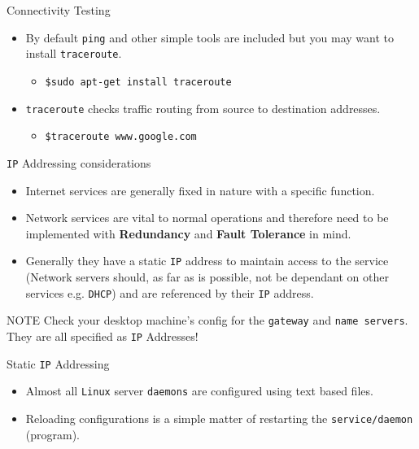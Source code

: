 \documentclass{beamer}
\begin{document}
\begin{frame}{Connectivity Testing}
  \begin{itemize}
    \item By default \texttt{ping} and other simple tools are included but you may want to install \texttt{traceroute}. 
      \begin{itemize}
        \item \texttt{\$sudo apt-get install traceroute}
      \end{itemize}
    \item \texttt{traceroute} checks traffic routing from source to destination addresses.
      \begin{itemize}
        \item \texttt{\$traceroute www.google.com}
      \end{itemize}
  \end{itemize}
\end{frame}

\begin{frame}{\texttt{IP} Addressing considerations}
   \begin{itemize}
     \item Internet services are generally fixed in nature with a specific function. 
     \item Network services are vital to normal operations and therefore need to be implemented with \textbf{Redundancy} and \textbf{Fault Tolerance} in mind.
     \item Generally they have a static \texttt{IP} address to maintain access to the service (Network servers should, as far as is possible, not be dependant on other services e.g. \texttt{DHCP}) and are referenced by their \texttt{IP} address.
   \end{itemize}
   \begin{block}{NOTE}
     Check your desktop machine's config for the \texttt{gateway} and \texttt{name servers}. They are  all specified as \texttt{IP} Addresses!
   \end{block}
\end{frame}

\begin{frame}{Static \texttt{IP} Addressing}
  \begin{itemize}
    \item Almost all \texttt{Linux} server \texttt{daemons} are configured using text based files.
    \item Reloading configurations is a simple matter of restarting the \texttt{service/daemon} (program).
  \end{itemize}
\end{frame}
\end{document}
